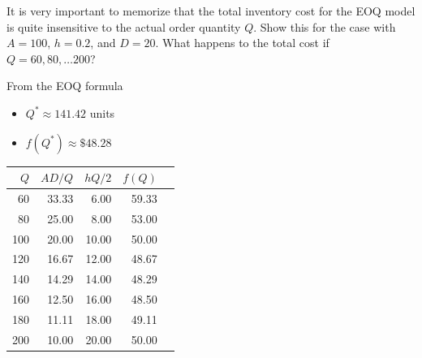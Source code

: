 \begin{question}
\begin{solution}
  \end{solution}
\end{question}

\begin{question}
  It is very important to memorize that the total inventory cost for
  the EOQ model is quite insensitive to the actual order quantity
  $Q$. Show this for the case with $A=100$, $h=0.2$, and $D=20$. What
  happens to the total cost if $Q=60, 80, \ldots 200$?
  \begin{solution}
From the EOQ formula
\begin{itemize}
\item $Q^{*} \approx 141.42$ units
\item $f(Q^{*}) \approx \mathdollar 48.28$
\end{itemize}

\begin{center}
\footnotesize
\begin{tabular}{rrrrr}
\toprule
$Q$     & $AD/Q$  &  $hQ/2$  & $f(Q)$ \\
\midrule
    60    & 33.33 &  6.00  & 59.33 \\
    80    & 25.00 &  8.00  & 53.00 \\
    100   & 20.00 &  10.00 & 50.00 \\
    120   & 16.67 &  12.00 & 48.67 \\
    140   & 14.29 &  14.00 & 48.29 \\
    160   & 12.50 &  16.00 & 48.50 \\
    180   & 11.11 &  18.00 & 49.11 \\
    200   & 10.00 &  20.00 & 50.00 \\
\bottomrule
\end{tabular}
\end{center}
  \end{solution}
\end{question}

